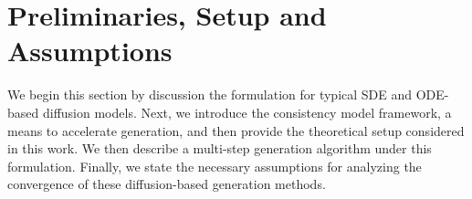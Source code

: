 \documentclass[11pt]{article}
\newcommand{\xh}[1]{\textcolor[HTML]{66CCFF}{#1}}
\begin{document}
\section{Preliminaries, Setup and Assumptions}
\label{subsec_3_notations}


We begin this section by discussion the formulation for typical SDE and ODE-based diffusion models. Next, we introduce the consistency model framework, a means to accelerate generation, and then provide the theoretical setup considered in this work. We then describe a multi-step generation algorithm under this formulation. Finally, we state the necessary assumptions for analyzing the convergence of these diffusion-based generation methods.
\end{document}
